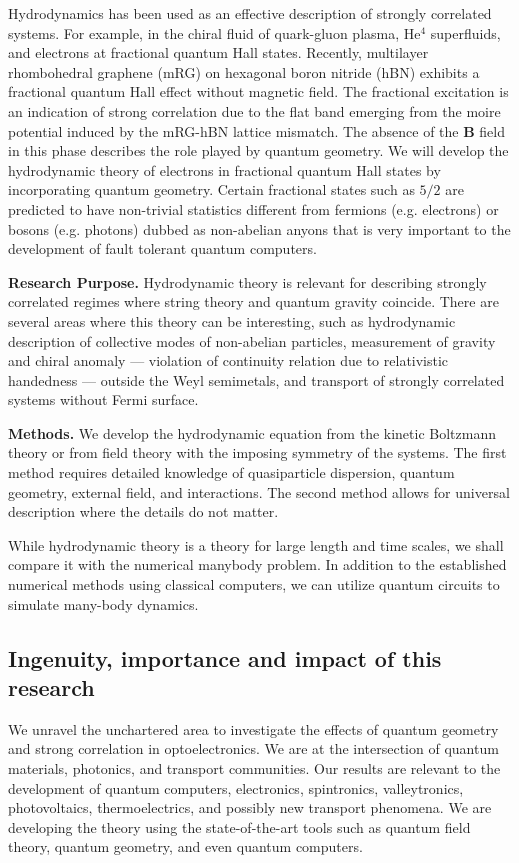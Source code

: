 \documentclass[a4paper,11pt]{article}
\begin{document}
Hydrodynamics has been used as an effective description of strongly
correlated systems. For example, in the chiral fluid of quark-gluon
plasma, He$^4$ superfluids, and electrons at fractional quantum Hall
states.  Recently, multilayer rhombohedral graphene (mRG) on hexagonal
boron nitride (hBN) exhibits a fractional quantum Hall effect without
magnetic field. The fractional excitation is an indication of strong
correlation due to the flat band emerging from the moire potential induced
by the mRG-hBN lattice mismatch. The absence of the $\mathbf{B}$ field in this
phase describes the role played by quantum geometry. We will develop
the hydrodynamic theory of electrons in fractional quantum Hall states
by incorporating quantum geometry. Certain fractional states such as
$5/2$ are predicted to have non-trivial statistics different from
fermions (e.g. electrons) or bosons (e.g. photons) dubbed as
non-abelian anyons that is very important to the development of fault
tolerant quantum computers.

{\bf Research Purpose.} Hydrodynamic theory is relevant for describing strongly correlated
regimes where string theory and quantum gravity coincide. There are
several areas where this theory can be interesting, such as hydrodynamic
description of collective modes of non-abelian particles, measurement
of gravity and chiral anomaly --- violation of continuity relation due
to relativistic handedness --- outside the Weyl semimetals, and
transport of strongly correlated systems without Fermi surface.

{\bf Methods.} We develop the hydrodynamic equation from the kinetic Boltzmann
theory or from field theory with the imposing symmetry of the systems. The
first method requires detailed knowledge of quasiparticle
dispersion, quantum geometry, external field, and interactions. The
second method allows for universal description where the details do
not matter.

While hydrodynamic theory is a theory for large length and time
scales, we shall compare it with the numerical manybody problem. In
addition to the established numerical methods using classical
computers, we can utilize quantum circuits to simulate many-body dynamics. 

\subsection*{Ingenuity, importance and impact of this research}
We unravel the unchartered area to investigate the effects of quantum geometry
and strong correlation in optoelectronics. We are at the intersection
of quantum materials, photonics, and transport communities. Our
results are relevant to the development of quantum computers,
electronics, spintronics, valleytronics, photovoltaics,
thermoelectrics, and possibly new transport phenomena. We are
developing the theory using the state-of-the-art tools such as quantum
field theory, quantum geometry, and even quantum computers.
\end{document}
